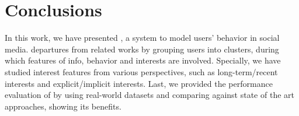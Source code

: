 \section{Conclusions}
\label{sec:conclu}

In this work, we have presented \sys{}, a system to model users' \retg{} behavior in social media. 
\sys{} departures from related works by grouping users into clusters, during which features of info, behavior and interests are involved. 
Specially, we have studied interest features from various perspectives, such as long-term/recent interests and explicit/implicit interests. 
Last, we provided the performance evaluation of \sys{} by using real-world datasets and comparing against state of the art approaches, showing its benefits.
 